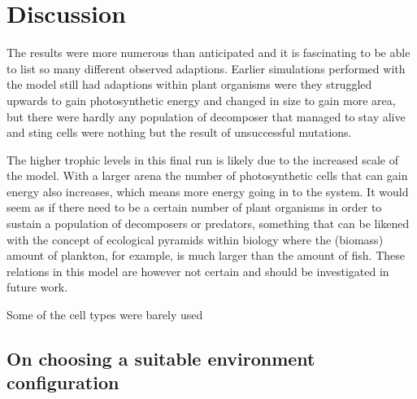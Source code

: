 \chapter{Discussion}



The results were more numerous than anticipated and it is fascinating to be able to list so many different observed adaptions. Earlier simulations performed with the model still had adaptions within plant organisms were they struggled upwards to gain photosynthetic energy and changed in size to gain more area, but there were hardly any population of decomposer that managed to stay alive and sting cells were nothing but the result of unsuccessful mutations.

The higher trophic levels in this final run is likely due to the increased scale of the model. With a larger arena the number of photosynthetic cells that can gain energy also increases, which means more energy going in to the system. It would seem as if there need to be a certain number of plant organisms in order to sustain a population of decomposers or predators, something that can be likened with the concept of ecological pyramids within biology where the (biomass) amount of plankton, for example, is much larger than the amount of fish. These relations in this model are however not certain and should be investigated in future work.

Some of the cell types were barely used

\section{On choosing a suitable environment configuration}

